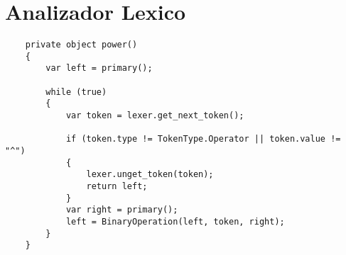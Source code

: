 \section{Analizador Lexico}

\lstset{style=sharpc}
\begin{lstlisting}
    private object power()
    {
        var left = primary();

        while (true)
        {
            var token = lexer.get_next_token();

            if (token.type != TokenType.Operator || token.value != "^")
            {
                lexer.unget_token(token);
                return left;
            }
            var right = primary();
            left = BinaryOperation(left, token, right);
        }
    }
\end{lstlisting}

